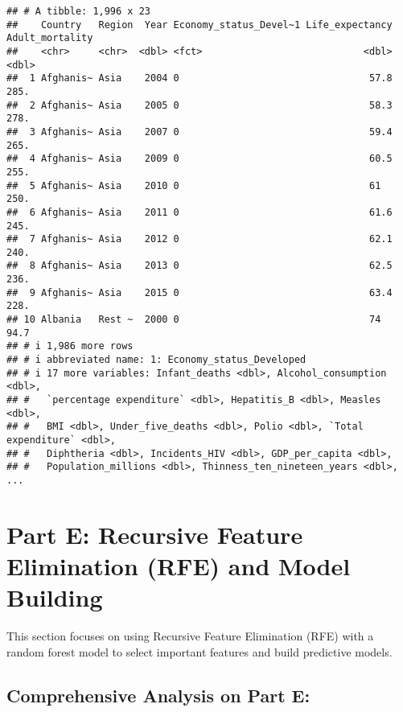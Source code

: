 \documentclass[
]{article}
\begin{document}
\begin{verbatim}
## # A tibble: 1,996 x 23
##    Country   Region  Year Economy_status_Devel~1 Life_expectancy Adult_mortality
##    <chr>     <chr>  <dbl> <fct>                            <dbl>           <dbl>
##  1 Afghanis~ Asia    2004 0                                 57.8           285. 
##  2 Afghanis~ Asia    2005 0                                 58.3           278. 
##  3 Afghanis~ Asia    2007 0                                 59.4           265. 
##  4 Afghanis~ Asia    2009 0                                 60.5           255. 
##  5 Afghanis~ Asia    2010 0                                 61             250. 
##  6 Afghanis~ Asia    2011 0                                 61.6           245. 
##  7 Afghanis~ Asia    2012 0                                 62.1           240. 
##  8 Afghanis~ Asia    2013 0                                 62.5           236. 
##  9 Afghanis~ Asia    2015 0                                 63.4           228. 
## 10 Albania   Rest ~  2000 0                                 74              94.7
## # i 1,986 more rows
## # i abbreviated name: 1: Economy_status_Developed
## # i 17 more variables: Infant_deaths <dbl>, Alcohol_consumption <dbl>,
## #   `percentage expenditure` <dbl>, Hepatitis_B <dbl>, Measles <dbl>,
## #   BMI <dbl>, Under_five_deaths <dbl>, Polio <dbl>, `Total expenditure` <dbl>,
## #   Diphtheria <dbl>, Incidents_HIV <dbl>, GDP_per_capita <dbl>,
## #   Population_millions <dbl>, Thinness_ten_nineteen_years <dbl>, ...
\end{verbatim}

\hypertarget{part-e-recursive-feature-elimination-rfe-and-model-building}{%
\section{Part E: Recursive Feature Elimination (RFE) and Model
Building}\label{part-e-recursive-feature-elimination-rfe-and-model-building}}

This section focuses on using Recursive Feature Elimination (RFE) with a
random forest model to select important features and build predictive
models.

\hypertarget{comprehensive-analysis-on-part-e}{%
\subsection{Comprehensive Analysis on Part
E:}\label{comprehensive-analysis-on-part-e}}
\end{document}
